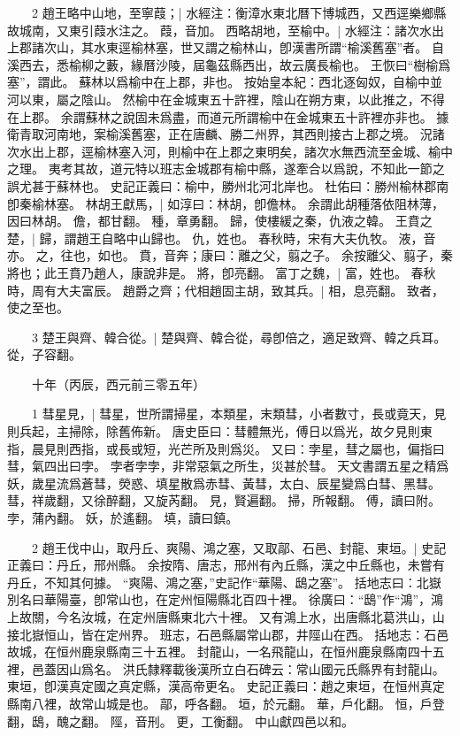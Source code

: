　　2 趙王略中山地，至寧葭；|{
	水經注：衡漳水東北曆下博城西，又西逕樂鄉縣故城南，又東引葭水注之。
	葭，音加。
}
西略胡地，至榆中。|{
	水經注：諸次水出上郡諸次山，其水東逕榆林塞，世又謂之榆林山，卽漢書所謂“榆溪舊塞”者。
	自溪西去，悉榆柳之藪，緣曆沙陵，屆龜茲縣西出，故云廣長榆也。
	王恢曰“樹榆爲塞”，謂此。
	蘇林以爲榆中在上郡，非也。
	按始皇本紀：西北逐匈奴，自榆中並河以東，屬之陰山。
	然榆中在金城東五十許裡，陰山在朔方東，以此推之，不得在上郡。
	余謂蘇林之說固未爲盡，而道元所謂榆中在金城東五十許裡亦非也。
	據衛青取河南地，案榆溪舊塞，正在唐麟、勝二州界，其西則接古上郡之境。
	況諸次水出上郡，逕榆林塞入河，則榆中在上郡之東明矣，諸次水無西流至金城、榆中之理。
	夷考其故，道元特以班志金城郡有榆中縣，遂牽合以爲說，不知此一節之誤尤甚于蘇林也。
	史記正義曰：榆中，勝州北河北岸也。
	杜佑曰：勝州榆林郡南卽秦榆林塞。
}
林胡王獻馬，|{
	如淳曰：林胡，卽儋林。
	余謂此胡種落依阻林薄，因曰林胡。
	儋，都甘翻。
	種，章勇翻。
}
歸，使樓緩之秦，仇液之韓。
	王賁之楚，|{
	歸，謂趙王自略中山歸也。
	仇，姓也。
	春秋時，宋有大夫仇牧。
	液，音亦。
	之，往也，如也。
	賁，音奔；康曰：離之父，翦之子。
	余按離父、翦子，秦將也；此王賁乃趙人，康說非是。
	將，卽亮翻。
}
富丁之魏，|{
	富，姓也。
	春秋時，周有大夫富辰。
}
趙爵之齊；代相趙固主胡，致其兵。|{
	相，息亮翻。
	致者，使之至也。
}

　　3 楚王與齊、韓合從。|{
	楚與齊、韓合從，尋卽倍之，適足致齊、韓之兵耳。
	從，子容翻。
}

　　十年（丙辰，西元前三零五年）

　　1 彗星見，|{
	彗星，世所謂掃星，本類星，末類彗，小者數寸，長或竟天，見則兵起，主掃除，除舊佈新。
	唐史臣曰：彗體無光，傅日以爲光，故夕見則東指，晨見則西指，或長或短，光芒所及則爲災。
	又曰：孛星，彗之屬也，偏指曰彗，氣四出曰孛。
	孛者孛孛，非常惡氣之所生，災甚於彗。
	天文書謂五星之精爲妖，歲星流爲蒼彗，熒惑、填星散爲赤彗、黃彗，太白、辰星變爲白彗、黑彗。
	彗，祥歲翻，又徐醉翻，又旋芮翻。
	見，賢遍翻。
	掃，所報翻。
	傅，讀曰附。
	孛，蒲內翻。
	妖，於遙翻。
	填，讀曰鎮。
}

　　2 趙王伐中山，取丹丘、爽陽、鴻之塞，又取鄗、石邑、封龍、東垣。|{
	史記正義曰：丹丘，邢州縣。
	余按隋、唐志，邢州有內丘縣，漢之中丘縣也，未嘗有丹丘，不知其何據。
	“爽陽、鴻之塞，”史記作“華陽、鴟之塞”。
	括地志曰：北嶽別名曰華陽臺，卽常山也，在定州恒陽縣北百四十裡。
	徐廣曰：“鴟”作“鴻”，鴻上故關，今名汝城，在定州唐縣東北六十裡。
	又有鴻上水，出唐縣北葛洪山，山接北嶽恒山，皆在定州界。
	班志，石邑縣屬常山郡，井陘山在西。
	括地志：石邑故城，在恒州鹿泉縣南三十五裡。
	封龍山，一名飛龍山，在恒州鹿泉縣南四十五裡，邑蓋因山爲名。
	洪氏隸釋載後漢所立白石碑云：常山國元氏縣界有封龍山。
	東垣，卽漢真定國之真定縣，漢高帝更名。
	史記正義曰：趙之東垣，在恒州真定縣南八裡，故常山城是也。
	鄗，呼各翻。
	垣，於元翻。
	華，戶化翻。
	恒，戶登翻，鴟，醜之翻。
	陘，音刑。
	更，工衡翻。
}
中山獻四邑以和。


